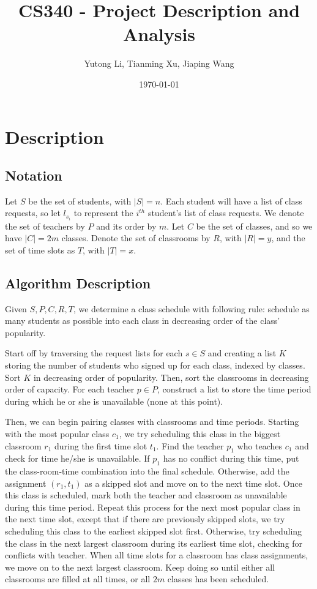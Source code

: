 \documentclass[11pt, oneside]{article}   	%
\title{CS340 - Project Description and Analysis}
\author{Yutong Li, Tianming Xu, Jiaping Wang}
\date{\today}							%
\begin{document}
\maketitle

\section{Description}
\subsection{Notation}
Let $S$ be the set of students, with $|S|=n$. Each student will have a list of class requests, so let $l_{s_i}$ to represent the $i^{th}$ student's list of class requests. We denote the set of teachers by $P$ and its order by $m$. Let $C$ be the set of classes, and so we have $|C|=2m$ classes. Denote the set of classrooms by $R$, with $|R|=y$, and the set of time slots as $T$, with $|T|=x$. 
\subsection{Algorithm Description}
Given $S, P, C, R, T$, we determine a class schedule with following rule: schedule as many students as possible into each class in decreasing order of the class' popularity. \par 
Start off by traversing the request lists for each $s\in S$ and creating a list $K$ storing the number of students who signed up for each class, indexed by classes. Sort $K$ in decreasing order of popularity. Then, sort the classrooms in decreasing order of capacity. For each teacher $p\in P$, construct a list to store the time period during which he or she is unavailable (none at this point). 

Then, we can begin pairing classes with classrooms and time periods. Starting with the most popular class $c_1$, we try scheduling this class in the biggest classroom $r_1$ during the first time slot $t_1$. Find the teacher $p_1$ who teaches $c_1$ and check for time he/she is unavailable. If $p_1$ has no conflict during this time, put the class-room-time combination into the final schedule. Otherwise, add the assignment $(r_1, t_1)$ as a skipped slot and move on to the next time slot. Once this class is scheduled, mark both the teacher and classroom as unavailable during this time period. Repeat this process for the next most popular class in the next time slot, except that if there are previously skipped slots, we try scheduling this class to the earliest skipped slot first. Otherwise, try scheduling the class in the next largest classroom during its earliest time slot, checking for conflicts with teacher. When all time slots for a classroom has class assignments, we move on to the next largest classroom. Keep doing so until either all classrooms are filled at all times, or all $2m$ classes has been scheduled.\\
\end{document}
